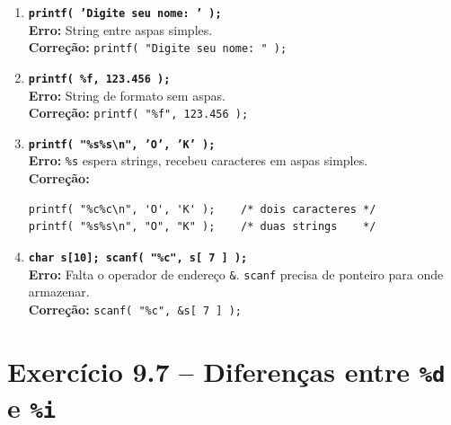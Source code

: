 \documentclass[12pt,a4paper]{article}
\begin{document}
\begin{respostabox}
\begin{enumerate}[label=\textbf{\alph*)}]
\item \textbf{\texttt{printf( 'Digite seu nome: ' );}}\\
\textbf{Erro:} String entre aspas simples.\\
\textbf{Correção:} \texttt{printf( "Digite seu nome: " );}

\item \textbf{\texttt{printf( \%f, 123.456 );}}\\
\textbf{Erro:} String de formato sem aspas.\\
\textbf{Correção:} \texttt{printf( "\%f", 123.456 );}

\item \textbf{\texttt{printf( "\%s\%s\textbackslash n", 'O', 'K' );}}\\
\textbf{Erro:} \texttt{\%s} espera strings, recebeu caracteres em aspas simples.\\
\textbf{Correção:}
\begin{lstlisting}
printf( "%c%c\n", 'O', 'K' );    /* dois caracteres */
printf( "%s%s\n", "O", "K" );    /* duas strings    */
\end{lstlisting}

\item \textbf{\texttt{char s[10]; scanf( "\%c", s[ 7 ] );}}\\
\textbf{Erro:} Falta o operador de endereço \texttt{\&}. \texttt{scanf} precisa de
ponteiro para onde armazenar.\\
\textbf{Correção:} \texttt{scanf( "\%c", \&s[ 7 ] );}

\end{enumerate}
\end{respostabox}

\newpage

\section{Exercício 9.7 -- Diferenças entre \texttt{\%d} e \texttt{\%i}}
\end{document}
